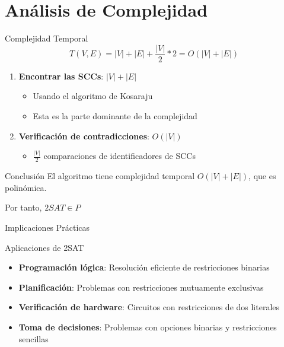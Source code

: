 \documentclass{beamer}
\begin{document}
\section{Análisis de Complejidad}
\begin{frame}{Complejidad Temporal}
\begin{equation*}
T(V, E) = |V| + |E| + \frac{|V|}{2} * 2 = O(|V| + |E|)
\end{equation*}

\begin{enumerate}
\item \textbf{Encontrar las SCCs}: $|V| + |E|$
   \begin{itemize}
   \item Usando el algoritmo de Kosaraju
   \item \alert{Esta es la parte dominante de la complejidad}
   \end{itemize}
   
\item \textbf{Verificación de contradicciones}: $O(|V|)$
   \begin{itemize}
   \item $\frac{|V|}{2}$ comparaciones de identificadores de SCCs
   \end{itemize}
\end{enumerate}

\begin{block}{Conclusión}
El algoritmo tiene complejidad temporal $O(|V| + |E|)$, que es polinómica.

Por tanto, \alert{$2SAT \in P$}
\end{block}
\end{frame}

\begin{frame}{Implicaciones Prácticas}
\begin{block}{Aplicaciones de 2SAT}
\begin{itemize}
\item \textbf{Programación lógica}: Resolución eficiente de restricciones binarias
\item \textbf{Planificación}: Problemas con restricciones mutuamente exclusivas
\item \textbf{Verificación de hardware}: Circuitos con restricciones de dos literales
\item \textbf{Toma de decisiones}: Problemas con opciones binarias y restricciones sencillas
\end{itemize}
\end{block}
\end{frame}
\end{document}
